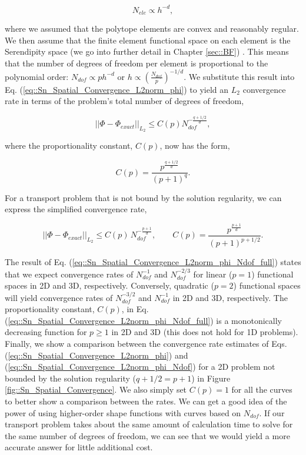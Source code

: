 \begin{equation}
\label{eq::Sn_Spatial_Convergence_Nele_to_h}
N_{ele} \propto h^{-d},
\end{equation}

\noindent where we assumed that the polytope elements are convex and reasonably regular. We then assume that the finite element functional space on each element is the Serendipity space (we go into further detail in Chapter \ref{sec::BF}) \cite{macneal1992eight,arnold2011serendipity}. This means that the number of degrees of freedom per element is proportional to the polynomial order: $N_{dof} \propto p h^{-d}$ or $h \propto \left(  \frac{N_{dof}}{p} \right)^{-1/d}$. We substitute this result into Eq. (\ref{eq::Sn_Spatial_Convergence_L2norm_phi}) to yield an $L_2$ convergence rate in terms of the problem's total number of degrees of freedom,

\begin{equation}
\label{eq::Sn_Spatial_Convergence_L2norm_phi_Ndof}
|| \Phi - \Phi_{exact} ||_{L_2} \leq C (p) N_{dof}^{-\frac{q+1/2}{d}},
\end{equation}

\noindent where the proportionality constant, $C(p)$, now has the form,

\begin{equation}
\label{eq::Sn_Spatial_Convergence_Cconstant}
C(p) =  \frac{p^{\frac{q+1/2}{d}}}{(p+1)^q}.
\end{equation}

\noindent For a transport problem that is not bound by the solution regularity, we can express the simplified convergence rate,

\begin{equation}
\label{eq::Sn_Spatial_Convergence_L2norm_phi_Ndof_full}
|| \Phi - \Phi_{exact} ||_{L_2} \leq C(p) \, N_{dof}^{-\frac{p+1}{d}}, \qquad C(p) = \frac{p^{\frac{p+1}{d}}}{(p+1)^{p+1/2}}.
\end{equation}

\noindent The result of Eq. (\ref{eq::Sn_Spatial_Convergence_L2norm_phi_Ndof_full}) states that we expect convergence rates of $N_{dof}^{-1}$ and $N_{dof}^{-2/3}$ for linear ($p=1$) functional spaces in 2D and 3D, respectively. Conversely, quadratic ($p=2$) functional spaces will yield convergence rates of $N_{dof}^{-3/2}$ and $N_{dof}^{-1}$ in 2D and 3D, respectively. The proportionality constant, $C(p)$, in Eq. (\ref{eq::Sn_Spatial_Convergence_L2norm_phi_Ndof_full}) is a monotonically decreasing function for $p \geq 1$ in 2D and 3D (this does not hold for 1D problems). Finally, we show a comparison between the convergence rate estimates of Eqs. (\ref{eq::Sn_Spatial_Convergence_L2norm_phi}) and (\ref{eq::Sn_Spatial_Convergence_L2norm_phi_Ndof}) for a 2D problem not bounded by the solution regularity ($q+1/2 = p+1$) in Figure \ref{fig::Sn_Spatial_Convergence}. We also simply set $C(p)=1$ for all the curves to better show a comparison between the rates. We can get a good idea of the power of using higher-order shape functions with curves based on $N_{dof}$. If our transport problem takes about the same amount of calculation time to solve for the same number of degrees of freedom, we can see that we would yield a more accurate answer for little additional cost.

